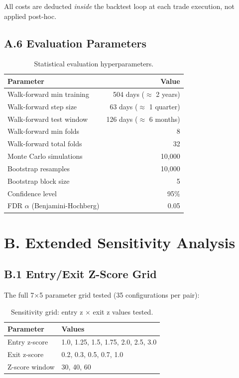 \documentclass[conference]{IEEEtran}
\begin{document}
All costs are deducted \emph{inside} the backtest loop at each trade
execution, not applied post-hoc.

\subsection{A.6 Evaluation Parameters}

\begin{table}[h]
\centering
\caption{Statistical evaluation hyperparameters.}
\label{tab:supp_eval}
\small
\begin{tabular}{lr}
\toprule
Parameter & Value \\
\midrule
Walk-forward min training & 504 days ($\approx$ 2 years) \\
Walk-forward step size & 63 days ($\approx$ 1 quarter) \\
Walk-forward test window & 126 days ($\approx$ 6 months) \\
Walk-forward min folds & 8 \\
Walk-forward total folds & 32 \\
Monte Carlo simulations & 10,000 \\
Bootstrap resamples & 10,000 \\
Bootstrap block size & 5 \\
Confidence level & 95\% \\
FDR $\alpha$ (Benjamini-Hochberg) & 0.05 \\
\bottomrule
\end{tabular}
\end{table}

\section{B. Extended Sensitivity Analysis}
\label{sec:sensitivity}

\subsection{B.1 Entry/Exit Z-Score Grid}

The full 7$\times$5 parameter grid tested (35 configurations per pair):

\begin{table}[h]
\centering
\caption{Sensitivity grid: entry z $\times$ exit z values tested.}
\label{tab:supp_grid}
\small
\begin{tabular}{ll}
\toprule
Parameter & Values \\
\midrule
Entry z-score & 1.0, 1.25, 1.5, 1.75, 2.0, 2.5, 3.0 \\
Exit z-score & 0.2, 0.3, 0.5, 0.7, 1.0 \\
Z-score window & 30, 40, 60 \\
\bottomrule
\end{tabular}
\end{table}
\end{document}
